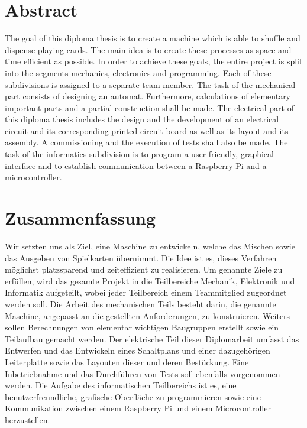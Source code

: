 \newpage
\thispagestyle{empty}
\mbox{}

\clearpage

\section*{Abstract}
\label{sec:abstract}
The goal of this diploma thesis is to create a machine which is able to shuffle and dispense playing cards.
The main idea is to create these processes as space and time efficient as possible.
In order to achieve these goals, the entire project is split into the segments mechanics, electronics and programming.
Each of these subdivisions is assigned to a separate team member.
The task of the mechanical part consists of designing an automat.
Furthermore, calculations of elementary important parts and a partial construction shall be made.
The electrical part of this diploma thesis includes the design and the development of an electrical circuit and its corresponding printed circuit board as well as its layout and its assembly.
A commissioning and the execution of tests shall also be made.
The task of the informatics subdivision is to program a user-friendly, graphical interface and to establish communication between a Raspberry Pi and a microcontroller.
\section*{Zusammenfassung}
Wir setzten uns als Ziel, eine Maschine zu entwickeln, welche das Mischen sowie das Ausgeben von Spielkarten übernimmt.
Die Idee ist es, dieses Verfahren möglichst platzsparend und zeiteffizient zu realisieren.
Um genannte Ziele zu erfüllen, wird das gesamte Projekt in die Teilbereiche Mechanik, Elektronik und Informatik aufgeteilt, wobei jeder Teilbereich einem Teammitglied zugeordnet werden soll.
Die Arbeit des mechanischen Teils besteht darin, die genannte Maschine, angepasst an die gestellten Anforderungen, zu konstruieren.
Weiters sollen Berechnungen von elementar wichtigen Baugruppen erstellt sowie ein Teilaufbau gemacht werden.
Der elektrische Teil dieser Diplomarbeit umfasst das Entwerfen und das Entwickeln eines Schaltplans
und einer dazugehörigen Leiterplatte sowie das Layouten dieser und deren Bestückung.
Eine Inbetriebnahme und das Durchführen von Tests soll ebenfalls vorgenommen werden.
Die Aufgabe des informatischen Teilbereichs ist es, eine benutzerfreundliche, grafische Oberfläche zu programmieren sowie eine Kommunikation zwischen einem Raspberry Pi und einem Microcontroller herzustellen.
\clearpage

